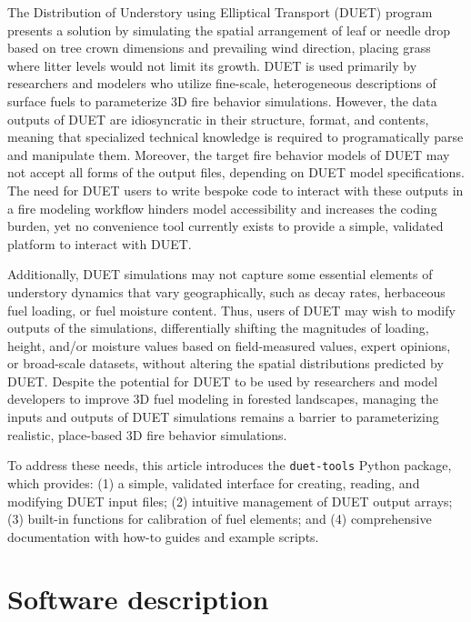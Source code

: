 \documentclass[preprint,12pt,a4paper]{elsarticle}
\begin{document}
The Distribution of Understory using Elliptical Transport (DUET) program \cite{mcdanold_duet_2023} presents a solution by simulating the spatial arrangement of leaf or needle drop based on tree crown dimensions and prevailing wind direction, placing grass where litter levels would not limit its growth.
DUET is used primarily by researchers and modelers who utilize fine-scale, heterogeneous descriptions of surface fuels to parameterize 3D fire behavior simulations.
However, the data outputs of DUET are idiosyncratic in their structure, format, and contents, meaning that specialized technical knowledge is required to programatically parse and manipulate them.
Moreover, the target fire behavior models of DUET may not accept all forms of the output files, depending on DUET model specifications.
The need for DUET users to write bespoke code to interact with these outputs in a fire modeling workflow hinders model accessibility and increases the coding burden, yet no convenience tool currently exists to provide a simple, validated platform to interact with DUET.\newline

Additionally, DUET simulations may not capture some essential elements of understory dynamics that vary geographically, such as decay rates, herbaceous fuel loading, or fuel moisture content.
Thus, users of DUET may wish to modify outputs of the simulations, differentially shifting the magnitudes of loading, height, and/or moisture values based on field-measured values, expert opinions, or broad-scale datasets, without altering the spatial distributions predicted by DUET.
Despite the potential for DUET to be used by researchers and model developers to improve 3D fuel modeling in forested landscapes, managing the inputs and outputs of DUET simulations remains a barrier to parameterizing realistic, place-based 3D fire behavior simulations.\newline

To address these needs, this article introduces the \texttt{duet-tools} Python package, which provides: (1) a simple, validated interface for creating, reading, and modifying DUET input files; (2) intuitive management of DUET output arrays; (3) built-in functions for calibration of fuel elements; and (4) comprehensive documentation with how-to guides and example scripts.

\section{Software description}
\end{document}

